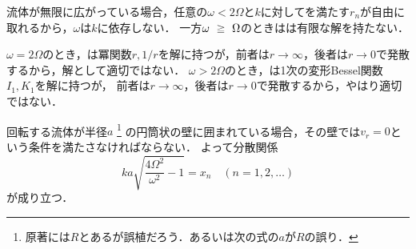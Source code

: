 \begin{kaitou}
流体が無限に広がっている場合，任意の$\omega<2\Omega$と$k$に対してを満たす$r_n$が自由に取れるから，$\omega$は$k$に依存しない．
一方$\omega \ijou \Omega$のときはは有限な解を持たない．

\begin{details}
$\omega=2\Omega$のとき，は冪関数$r,1/r$を解に持つが，前者は$r\to\infty$，後者は$r\to0$で発散するから，解として適切ではない．
$\omega>2\Omega$のとき，は1次の変形Bessel関数$I_1,K_1$を解に持つが，
前者は$r\to\infty$，後者は$r\to0$で発散するから，やはり適切ではない．
\end{details}


回転する流体が半径$a$
\footnote{原著には$R$とあるが誤植だろう．あるいは次の式の$a$が$R$の誤り．}
の円筒状の壁に囲まれている場合，その壁では$v_r=0$という条件を満たさなければならない．
よって分散関係
\[
    ka \sqrt{ \frac{4\Omega^2}{\omega^2} -1 } = x_n \quad (n=1,2,\ldots)
\]
が成り立つ．

\end{kaitou}





